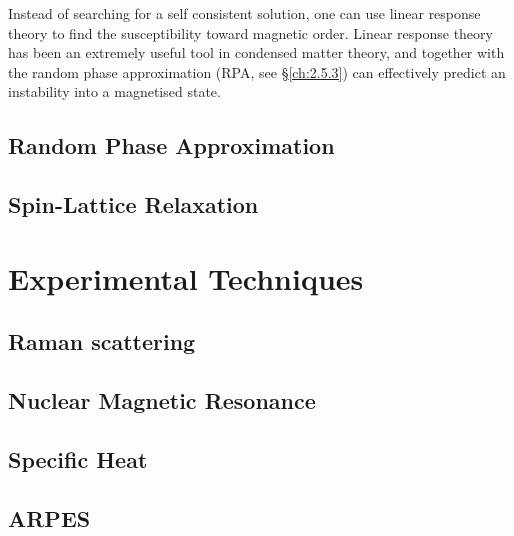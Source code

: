 Instead of searching for a self consistent solution, one can use linear response theory to find the susceptibility toward magnetic order. Linear response theory has been an extremely useful tool in condensed matter theory, and together with the random phase approximation (RPA, see \S \ref{ch:2.5.3}) can effectively predict an instability into a magnetised state.

\subsection{\label{ch:2.5.3}Random Phase Approximation}
\subsection{\label{ch:2.5.4}Spin-Lattice Relaxation}

\section{\label{ch:2.6}Experimental Techniques}
\subsection{\label{ch:2.6.1}Raman scattering}
\subsection{\label{ch:2.6.2}Nuclear Magnetic Resonance}
\subsection{\label{ch:2.6.3}Specific Heat}
\subsection{\label{ch:2.6.4}ARPES}

